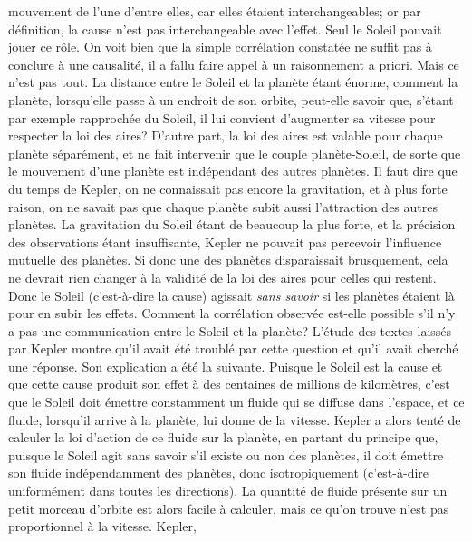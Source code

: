 mouvement de l'une d'entre elles, car elles \'etaient interchangeables; 
or par d\'efinition, la cause n'est pas interchangeable avec l'effet. 
Seul le Soleil pouvait jouer ce r\^ole. On voit bien que la simple 
corr\'elation constat\'ee ne suffit pas \`a conclure \`a une causalit\'e, 
il a fallu faire appel \`a un raisonnement a priori. 
\medskip 
Mais ce n'est pas tout. La distance entre le Soleil et la plan\`ete
\'etant \'enorme, comment la plan\`ete, lorsqu'elle passe \`a un endroit
de son orbite, peut-elle {\og savoir\fg} que, s'\'etant par exemple 
rapproch\'ee du Soleil, il lui convient d'augmenter sa vitesse pour 
respecter la loi des aires? D'autre part, la loi des aires est valable 
pour chaque plan\`ete s\'epar\'ement, et ne fait intervenir que le 
couple plan\`ete-Soleil, de sorte que le mouvement d'une plan\`ete
est ind\'ependant des autres plan\`etes. Il faut dire que du temps de 
Kepler, on ne connaissait pas encore la gravitation, et \`a plus forte 
raison, on ne savait pas que chaque plan\`ete subit aussi l'attraction 
des autres plan\`etes. La gravitation du Soleil \'etant de beaucoup la 
plus forte, et la pr\'ecision des observations \'etant insuffisante, 
Kepler ne pouvait pas percevoir l'influence mutuelle des plan\`etes. 
Si donc une des plan\`etes disparaissait brusquement, cela ne devrait 
rien changer \`a la validit\'e de la loi des aires pour celles qui restent. 
Donc le Soleil (c'est-\`a-dire la cause) agissait {\it sans savoir} si 
les plan\`etes \'etaient l\`a pour en subir les effets. Comment la 
corr\'elation observ\'ee est-elle possible s'il n'y a pas une 
communication entre le Soleil et la plan\`ete? L'\'etude des textes 
laiss\'es par Kepler montre qu'il avait \'et\'e troubl\'e par cette 
question et qu'il avait cherch\'e une r\'eponse. Son explication a \'et\'e 
la suivante. Puisque le Soleil est la cause et que cette cause produit 
son effet \`a des centaines de millions de kilom\`etres, c'est que le 
Soleil doit \'emettre constamment un fluide qui se diffuse dans 
l'espace, et ce fluide, lorsqu'il arrive \`a la plan\`ete, lui donne de la 
vitesse. Kepler a alors tent\'e de calculer la loi d'action de ce fluide 
sur la plan\`ete, en partant du principe que, puisque le Soleil agit sans 
savoir s'il existe ou non des plan\`etes, il doit \'emettre son fluide 
ind\'ependamment des plan\`etes, donc isotropiquement (c'est-\`a-dire 
uniform\'ement dans toutes les directions). La quantit\'e de fluide 
pr\'esente sur un petit morceau d'orbite est alors facile \`a calculer, 
mais ce qu'on trouve n'est pas proportionnel \`a la vitesse. Kepler, 
